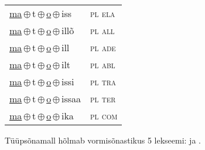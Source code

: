 \begin{minipage}{\textwidth}
\begin{sideways}
\begin{tabular}{l l}
\underline{ma}\,$\oplus$\,t\,$\oplus$\,\underline{o}\,$\oplus$\,iss & \textsc{ pl ela } \\
\underline{ma}\,$\oplus$\,t\,$\oplus$\,\underline{o}\,$\oplus$\,illõ & \textsc{ pl all } \\
\underline{ma}\,$\oplus$\,t\,$\oplus$\,\underline{o}\,$\oplus$\,ill & \textsc{ pl ade } \\
\underline{ma}\,$\oplus$\,t\,$\oplus$\,\underline{o}\,$\oplus$\,ilt & \textsc{ pl abl } \\
\underline{ma}\,$\oplus$\,t\,$\oplus$\,\underline{o}\,$\oplus$\,issi & \textsc{ pl tra } \\
\underline{ma}\,$\oplus$\,t\,$\oplus$\,\underline{o}\,$\oplus$\,issaa & \textsc{ pl ter } \\
\underline{ma}\,$\oplus$\,t\,$\oplus$\,\underline{o}\,$\oplus$\,ika & \textsc{ pl com } \\
\end{tabular}
\end{sideways}
\label{tab:tüüpsõnamall-mato}

\end{minipage}

 
\vspace{1em}
\noindent Tüüpsõnamall  hõlmab vormisõnastikus 5 lekseemi:  ja .
